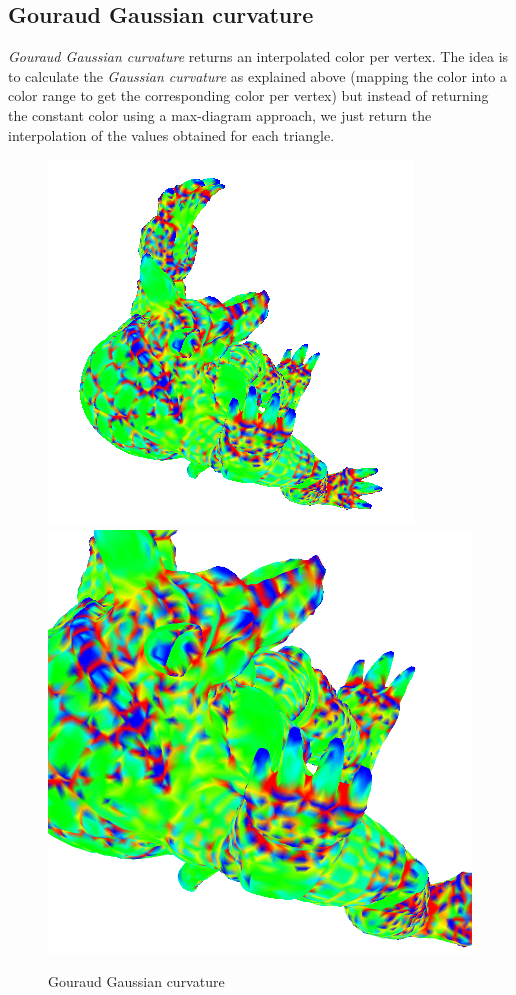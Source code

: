 \subsection{Gouraud Gaussian curvature}
\textit{Gouraud Gaussian curvature} returns an interpolated color per vertex. The idea is to calculate the \textit{Gaussian curvature} as explained above (mapping the color into a color range to get the corresponding color per vertex) but instead of returning the constant color using a max-diagram approach, we just return the interpolation of the values obtained for each triangle.

\begin{figure}[!h]
    \centering
    \centering
    \includegraphics[scale=1.0]{images/gci-armadillo-top.png}
    \endminipage\hfill
    \centering
    \includegraphics[scale=0.4]{images/gci-detail-armadillo-top.png}
    \endminipage
    \caption{Gouraud Gaussian curvature} \label{fig:gci-detail}
\end{figure}


